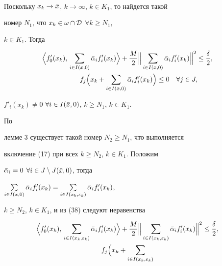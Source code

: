 \begin{pf}
\begin{gather*}
\end{gather*}


Поскольку $x_k\to\Bar x$, $k\to\infty$, $k\in K_1$, то найдется такой


номер $N_1$, что $x_k\in\omega\cap\cal D$ $\forall k\ge N_1$,


$k\in K_1$. Тогда


\begin{equation}


\begin{split}


\Bigl\la f'_0(x_k),\,\sum_{i\in I(\Bar x,0)}\Bar\alpha_i & f'_i(x_k)


\Bigr\ra+\frac{M}{2}\Bigl\|\,\sum_{i\in I(\Bar x,0)}


\Bar\alpha_if'_i(x_k)\Bigr\|^2\le \frac{\delta}{2},\\


f_j\Bigl(x_k & +\sum_{i\in I(\Bar x,0)}\Bar\alpha_if'_i(x_k)\Bigr)


\le 0 \quad \forall j\in J,


\end{split}


\end{equation}


$f'_i(x_k)\ne 0$ $\forall i\in I(\Bar x,0)$, $k\ge N_1$, $k\in K_1$.


По


лемме 3 существует такой номер $N_2\ge N_1$, что выполняется


включение (17) при всех $k\ge N_2$, $k\in K_1$. Положим


$\Bar\alpha_i=0$ $\forall i\in J\setminus J(\Bar x,0)$, тогда


$\sum\limits_{i\in I(\Bar x,0)}\Bar\alpha_if'_i(x_k)=


\sum\limits_{i\in I(x_k,\varepsilon_k)}\Bar\alpha_if'_i(x_k)$,


$k\ge N_2$, $k\in K_1$, и из (38) следуют неравенства


\begin{gather}


\Bigl\la f'_0(x_k),\,\sum_{i\in I(x_k,\varepsilon_k)}


\Bar\alpha_if'_i(x_k)


\Bigr\ra+\frac{M}{2}\Bigl\|\,\sum_{i\in I(x_k,\varepsilon_k)}


\Bar\alpha_if'_i(x_k)\Bigr\|^2\le \frac{\delta}{2},\\


f_j\Bigl(x_k+\sum_{i\in I(x_k,\varepsilon_k)}



\end{gather}
\end{pf}
